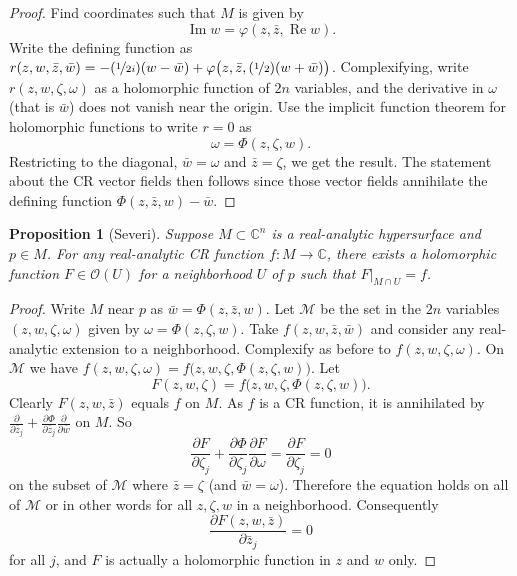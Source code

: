 \documentclass[12pt,openany]{book}
\renewcommand{\Re}{\operatorname{Re}}
\renewcommand{\Im}{\operatorname{Im}}
\newcommand{\C}{{\mathbb{C}}}
\newcommand{\sM}{{\mathcal{M}}}
\newcommand{\sO}{{\mathcal{O}}}
\theoremstyle{plain}
\newtheorem{prop}[thm]{Proposition}
\theoremstyle{remark}
\theoremstyle{definition}
\theoremstyle{exercise}
\theoremstyle{example}
\begin{document}
\begin{proof}
Find coordinates such that $M$ is given by
\begin{equation*}
\Im w = \varphi(z,\bar{z},\Re w) .
\end{equation*}
Write the defining function
as $r(z,w,\bar{z},\bar{w}) = -(\nicefrac{1}{2i})(w-\bar{w})
+\varphi\bigl(z,\bar{z},(\nicefrac{1}{2})(w+\bar{w})\bigr)$.
Complexifying, write
$r(z,w,\zeta,\omega)$ as
a holomorphic function of $2n$ variables, and the derivative in
$\omega$ (that is $\bar{w}$) does not vanish near the origin.
Use the implicit function theorem for holomorphic functions to write 
$r = 0$ as
\begin{equation*}
\omega = \Phi(z,\zeta,w) .
\end{equation*}
Restricting to the diagonal, $\bar{w} = \omega$ and $\bar{z}=\zeta$,
we get the result.
The statement about the CR vector fields then follows since those vector
fields annihilate the defining function $\Phi(z,\bar{z},w)-\bar{w}$.
\end{proof}

\begin{prop}[Severi] \label{prop:severi}
Suppose $M \subset \C^n$ is a real-analytic hypersurface and $p \in M$.
For any real-analytic CR function $f \colon M \to \C$, there exists
a holomorphic function $F \in \sO(U)$ for a neighborhood $U$ of $p$
such that $F|_{M \cap U} = f$.
\end{prop}

\begin{proof}
Write $M$ near $p$ as $\bar{w} = \Phi(z,\bar{z},w)$.
Let $\sM$ be the set in the $2n$ variables $(z,w,\zeta,\omega)$ given by
$\omega = \Phi(z,\zeta,w)$.
Take $f(z,w,\bar{z},\bar{w})$ and consider any real-analytic extension
to a neighborhood.  Complexify as before to
$f(z,w,\zeta,\omega)$.  On $\sM$ we have
$f(z,w,\zeta,\omega) = f\bigl(z,w,\zeta,\Phi(z,\zeta,w)\bigr)$.  Let
\begin{equation*}
F(z,w,\zeta) = f\bigl(z,w,\zeta,\Phi(z,\zeta,w)\bigr).
\end{equation*}
Clearly $F(z,w,\bar{z})$ equals $f$ on $M$.  
As $f$ is a CR function, it is annihilated by
$\frac{\partial}{\partial \bar{z}_j}
+\frac{\partial \Phi}{\partial \bar{z}_j} \frac{\partial}{\partial
\bar{w}}$ on $M$.  So
\begin{equation*}
\frac{\partial F}{\partial \zeta_j}
+\frac{\partial \Phi}{\partial \zeta_j} \frac{\partial F}{\partial
\omega}
=
\frac{\partial F}{\partial \zeta_j} = 0
\end{equation*}
on the subset of $\sM$ where $\bar{z} = \zeta$ (and $\bar{w}=\omega$).
Therefore the equation holds on all of $\sM$ or in other words for
all $z,\zeta,w$ in a neighborhood.  Consequently
\begin{equation*}
\frac{\partial F(z,w,\bar{z})}{\partial \bar{z}_j} = 0
\end{equation*}
for all $j$,
and $F$ is actually a holomorphic function in $z$ and $w$ only.
\end{proof}
\end{document}
